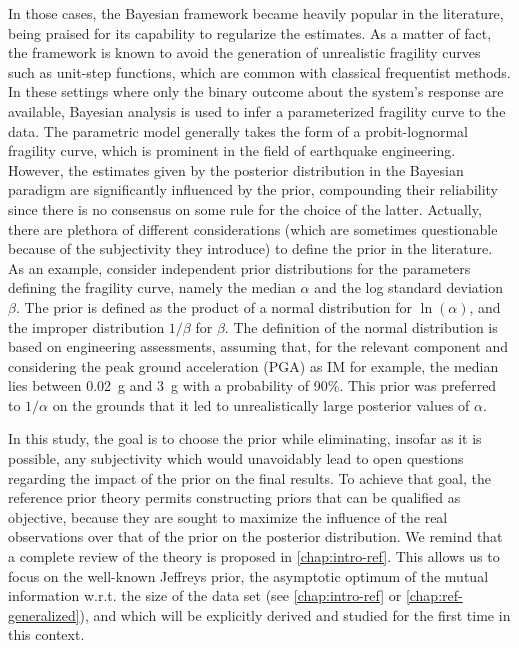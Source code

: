 In those cases, the Bayesian framework became heavily popular in the literature, being praised for its capability to regularize the estimates. As a matter of fact, the framework is known to
avoid the generation of unrealistic fragility curves such as unit-step functions, which are common with
 classical frequentist methods.  %
In these settings where only the binary outcome about the system's response are available, Bayesian analysis is used to infer a parameterized fragility curve to the data. The
parametric model generally takes the form of a probit-lognormal fragility curve, which is prominent in the field of earthquake engineering.
%
%
However, the estimates given by the posterior distribution in the  Bayesian paradigm %
are significantly influenced by the prior, 
compounding their reliability since there is no consensus on some rule for the choice of the latter.
Actually,
there are plethora of different considerations (which are sometimes questionable because of the subjectivity they introduce) to define the prior in the literature.
As an example, \citet{straub_improved_2008}
consider independent prior distributions for the parameters defining the fragility curve, namely the median $\alpha$ and the log standard deviation $\beta$. The prior is defined as the product of a normal distribution for $\ln(\alpha)$, and the improper distribution $1/\beta$ for $\beta$. The definition of the normal distribution is based on engineering assessments, assuming that, for the relevant component and considering the peak ground acceleration (PGA) as IM for example, the median lies between 0.02~g and 3~g with a probability of 90\%. This prior was preferred to $1/\alpha$ on the grounds that it led to unrealistically large posterior values of $\alpha$.



In this study, the goal is to choose the prior while eliminating, insofar as it is possible, any subjectivity which would unavoidably lead to open questions regarding the impact of the prior on the final results. %
To achieve that goal, the reference prior theory permits constructing priors that can be qualified as objective, because they are sought to maximize the influence of the real observations over that of the prior on the posterior distribution.
We remind that a complete review of the theory is proposed in \cref{chap:intro-ref}.
This allows us to focus on the well-known Jeffreys prior, the asymptotic optimum of the mutual information w.r.t. the size of the data set (see \cref{chap:intro-ref} or \cref{chap:ref-generalized}), and which will be explicitly derived and studied for the first time in this context. 


